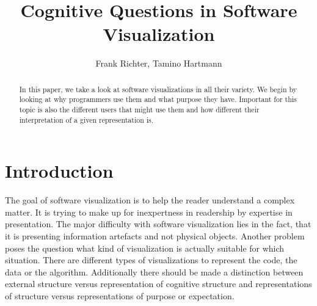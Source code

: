 \documentclass[11pt, a4paper, ngerman, twoside]{article}
\date{}
\theoremstyle{plain}\newtheorem{Lemma}{Lemma}
\theoremstyle{plain}\newtheorem{Satz}[Lemma]{Satz}
\theoremstyle{definition}\newtheorem{Definition}[Lemma]{Definition}
\theoremstyle{definition}\newtheorem*{Beispiel}{Beispiel}
\theoremstyle{remark}\newtheorem*{Bemerkung}{Bemerkung}
\begin{document}
\title{Cognitive Questions in Software Visualization}
\author{Frank Richter, Tamino Hartmann}

\makeatletter
\let\mytitle\@title
\let\myauthor\@author
\makeatother
\maketitle
\begin{abstract}

In this paper, we take a look at software visualizations in all their variety. We begin by looking at why programmers use them and what purpose they have. Important for this topic is also the different users that might use them and how different their interpretation of a given representation is.

\end{abstract}

\section{Introduction}
The goal of software visualization is to help the reader understand a complex matter. It is trying to make up for inexpertness in readership by expertise in presentation. The major difficulty with software visualization lies in the fact, that it is presenting information artefacts and not physical objects. Another problem poses the question what kind of visualization is actually suitable for which situation.
There are different types of visualizations to represent the code, the data or the algorithm\cite{myers}. Additionally there should be made a distinction between external structure versus representation of cognitive structure and representations of structure versus representations of purpose or expectation\cite{origin}.
\end{document}
